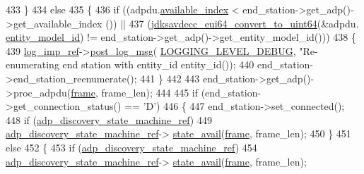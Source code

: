 \begin{DoxyCode}
433                 \}
434                 \textcolor{keywordflow}{else}
435                 \{
436                     \textcolor{keywordflow}{if} ((adpdu.\hyperlink{structjdksavdecc__adpdu_abbe4a72641a81cba6569feb1a446d431}{available\_index} < end\_station->get\_adp()->get\_available\_index
      ()) ||
437                         (\hyperlink{group__eui64_ga1c9a3634faa4bec90dea5a52e691bf63}{jdksavdecc\_eui64\_convert\_to\_uint64}(&adpdu.
      \hyperlink{structjdksavdecc__adpdu_a2d1d52d1ec5c6100b61acf3daa452c56}{entity\_model\_id}) != end\_station->get\_adp()->get\_entity\_model\_id()))
438                     \{
439                         \hyperlink{namespaceavdecc__lib_acbe3e2a96ae6524943ca532c87a28529}{log\_imp\_ref}->\hyperlink{classavdecc__lib_1_1log_a68139a6297697e4ccebf36ccfd02e44a}{post\_log\_msg}(
      \hyperlink{namespaceavdecc__lib_a501055c431e6872ef46f252ad13f85cdae3138c2a0a71a6404155ff912e450406}{LOGGING\_LEVEL\_DEBUG}, \textcolor{stringliteral}{"Re-enumerating end station with entity\_id %
      entity\_id());
440                         end\_station->end\_station\_reenumerate();
441                     \}
442 
443                     end\_station->get\_adp()->proc\_adpdu(\hyperlink{gst__avb__playbin_8c_ac8e710e0b5e994c0545d75d69868c6f0}{frame}, frame\_len);
444 
445                     \textcolor{keywordflow}{if} (end\_station->get\_connection\_status() == \textcolor{charliteral}{'D'})
446                     \{
447                         end\_station->set\_connected();
448                         \textcolor{keywordflow}{if} (\hyperlink{namespaceavdecc__lib_aa33697f1203280924134bb7fdcc76129}{adp\_discovery\_state\_machine\_ref})
449                             \hyperlink{namespaceavdecc__lib_aa33697f1203280924134bb7fdcc76129}{adp\_discovery\_state\_machine\_ref}->
      \hyperlink{classavdecc__lib_1_1adp__discovery__state__machine_aae62b5ebcd540a385966c89b65cc2ac7}{state\_avail}(\hyperlink{gst__avb__playbin_8c_ac8e710e0b5e994c0545d75d69868c6f0}{frame}, frame\_len);
450                     \}
451                     \textcolor{keywordflow}{else}
452                     \{
453                         \textcolor{keywordflow}{if} (\hyperlink{namespaceavdecc__lib_aa33697f1203280924134bb7fdcc76129}{adp\_discovery\_state\_machine\_ref})
454                             \hyperlink{namespaceavdecc__lib_aa33697f1203280924134bb7fdcc76129}{adp\_discovery\_state\_machine\_ref}->
      \hyperlink{classavdecc__lib_1_1adp__discovery__state__machine_aae62b5ebcd540a385966c89b65cc2ac7}{state\_avail}(\hyperlink{gst__avb__playbin_8c_ac8e710e0b5e994c0545d75d69868c6f0}{frame}, frame\_len);
}
\end{DoxyCode}

